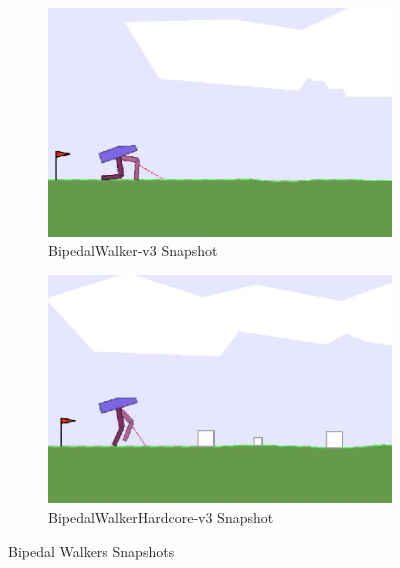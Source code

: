 \begin{figure}
	\begin{subfigure}{.5\textwidth}
		\centering
		\includegraphics[width=0.9\linewidth]{figures/bipedal/classic.png}
		\caption{BipedalWalker-v3 Snapshot}
		\label{fig:bipedal_walker_classic}
	\end{subfigure}
	\begin{subfigure}{.5\textwidth}
		\centering
		\includegraphics[width=0.9\linewidth]{figures/bipedal/hardcore.png}
		\caption{BipedalWalkerHardcore-v3 Snapshot}
		\label{fig:bipedal_walker_hardcore}
	\end{subfigure}
	\caption{Bipedal Walkers Snapshots}
	\label{fig:bipedal_walkers}
\end{figure}

